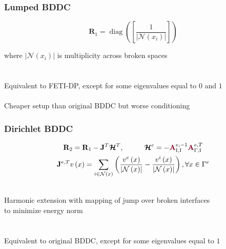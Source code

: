 \documentclass{beamer}
\DeclareMathOperator{\diag}{diag}
\begin{document}
\begin{frame}
\begin{center}
\frametitle{Lumped BDDC}

\begin{equation}
\mathbf{R}_1 = \diag \left( \left[ \frac{1}{\lvert \mathcal{N} \left( x_i \right) \rvert} \right] \right)
\end{equation}

where $\lvert \mathcal{N} \left( x_i \right) \rvert$ is multiplicity across broken spaces\\

~\\

~\\

Equivalent to FETI-DP, except for some eigenvalues equal to $0$ and $1$ \cite{li2007use}\\

~\\

Cheaper setup than original BDDC but worse conditioning

\end{center}
\end{frame}


\begin{frame}
\begin{center}
\frametitle{Dirichlet BDDC}

\begin{equation}
\begin{gathered}
\mathbf{R}_2 = \mathbf{R}_1 - \mathbf{J}^T \boldsymbol{\mathcal{H}}^T, \hspace{10mm} \boldsymbol{\mathcal{H}}^e = - {\color{burgundy}\mathbf{A}}_{\text{I}, \text{I}}^{e, -1} {\color{burgundy}\mathbf{A}}_{\Gamma, \text{I}}^{e, T}\\
\mathbf{J}^{e, T} v \left( x \right) = \sum_{i \in \mathcal{N} \left( x \right)} \left( \frac{v^e \left( x \right)}{\lvert \mathcal{N} \left( x \right) \rvert} - \frac{v^i \left( x \right)}{\lvert \mathcal{N} \left( x \right) \rvert} \right), \forall x \in \Gamma^e
\end{gathered}
\end{equation}

~\\

Harmonic extension with mapping of jump over broken interfaces\\to minimize energy norm\\

~\\

~\\

Equivalent to original BDDC, except for some eigenvalues equal to $1$ \cite{li2007use}

\end{center}
\end{frame}
\end{document}
